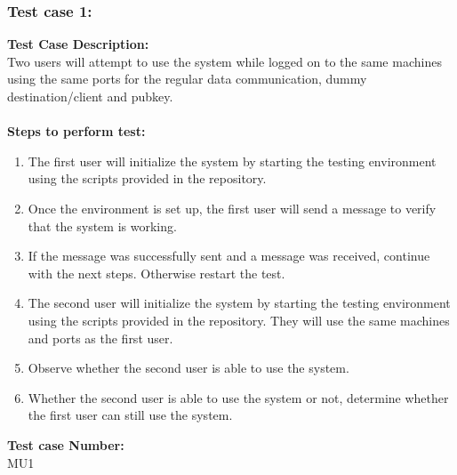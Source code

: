 \documentclass{article}
\begin{document}
\subsubsection{Test case 1: }
\textbf{Test Case Description:\\} Two users will attempt to use the system while logged on to the same machines using the same ports for the regular data communication, dummy destination/client and pubkey.\\\\
\textbf{Steps to perform test:} 
\begin{enumerate}
    \item The first user will initialize the system by starting the testing environment using the scripts provided in the repository.
    \item Once the environment is set up, the first user will send a message to verify that the system is working.
    \item If the message was successfully sent and a message was received, continue with the next steps. Otherwise restart the test.
    \item The second user will initialize the system by starting the testing environment using the scripts provided in the repository. They will use the same machines and ports as the first user.
    \item Observe whether the second user is able to use the system.
    \item Whether the second user is able to use the system or not, determine whether the first user can still use the system.
\end{enumerate}
\textbf{Test case Number: \\} MU1
\end{document}
